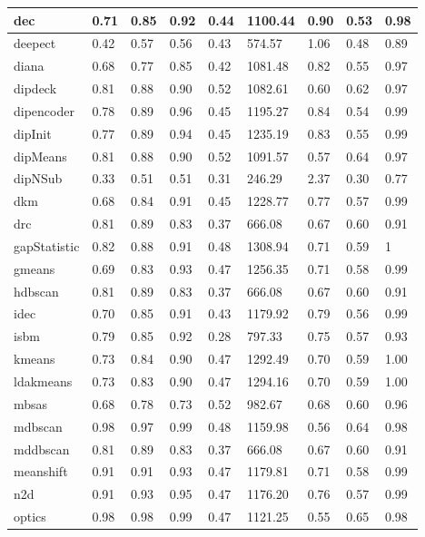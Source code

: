 \begin{table}[H]
\begin{tabular}{|l|l|l|l|l|l|l|l|l|}
\hline
dec & 0.71 & 0.85 & 0.92 & 0.44 & 1100.44 & 0.90 & 0.53 & 0.98 \\
\hline
deepect & 0.42 & 0.57 & 0.56 & 0.43 & 574.57 & 1.06 & 0.48 & 0.89 \\
\hline
diana & 0.68 & 0.77 & 0.85 & 0.42 & 1081.48 & 0.82 & 0.55 & 0.97 \\
\hline
dipdeck & 0.81 & 0.88 & 0.90 & 0.52 & 1082.61 & 0.60 & 0.62 & 0.97 \\
\hline
dipencoder & 0.78 & 0.89 & 0.96 & 0.45 & 1195.27 & 0.84 & 0.54 & 0.99 \\
\hline
dipInit & 0.77 & 0.89 & 0.94 & 0.45 & 1235.19 & 0.83 & 0.55 & 0.99 \\
\hline
dipMeans & 0.81 & 0.88 & 0.90 & 0.52 & 1091.57 & 0.57 & 0.64 & 0.97 \\
\hline
dipNSub & 0.33 & 0.51 & 0.51 & 0.31 & 246.29 & 2.37 & 0.30 & 0.77 \\
\hline
dkm & 0.68 & 0.84 & 0.91 & 0.45 & 1228.77 & 0.77 & 0.57 & 0.99 \\
\hline
drc & 0.81 & 0.89 & 0.83 & 0.37 & 666.08 & 0.67 & 0.60 & 0.91 \\
\hline
gapStatistic & 0.82 & 0.88 & 0.91 & 0.48 & 1308.94 & 0.71 & 0.59 & 1 \\
\hline
gmeans & 0.69 & 0.83 & 0.93 & 0.47 & 1256.35 & 0.71 & 0.58 & 0.99 \\
\hline
hdbscan & 0.81 & 0.89 & 0.83 & 0.37 & 666.08 & 0.67 & 0.60 & 0.91 \\
\hline
idec & 0.70 & 0.85 & 0.91 & 0.43 & 1179.92 & 0.79 & 0.56 & 0.99 \\
\hline
isbm & 0.79 & 0.85 & 0.92 & 0.28 & 797.33 & 0.75 & 0.57 & 0.93 \\
\hline
kmeans & 0.73 & 0.84 & 0.90 & 0.47 & 1292.49 & 0.70 & 0.59 & 1.00 \\
\hline
ldakmeans & 0.73 & 0.83 & 0.90 & 0.47 & 1294.16 & 0.70 & 0.59 & 1.00 \\
\hline
mbsas & 0.68 & 0.78 & 0.73 & 0.52 & 982.67 & 0.68 & 0.60 & 0.96 \\
\hline
mdbscan & 0.98 & 0.97 & 0.99 & 0.48 & 1159.98 & 0.56 & 0.64 & 0.98 \\
\hline
mddbscan & 0.81 & 0.89 & 0.83 & 0.37 & 666.08 & 0.67 & 0.60 & 0.91 \\
\hline
meanshift & 0.91 & 0.91 & 0.93 & 0.47 & 1179.81 & 0.71 & 0.58 & 0.99 \\
\hline
n2d & 0.91 & 0.93 & 0.95 & 0.47 & 1176.20 & 0.76 & 0.57 & 0.99 \\
\hline
optics & 0.98 & 0.98 & 0.99 & 0.47 & 1121.25 & 0.55 & 0.65 & 0.98 \\

\end{tabular}
\end{table}
